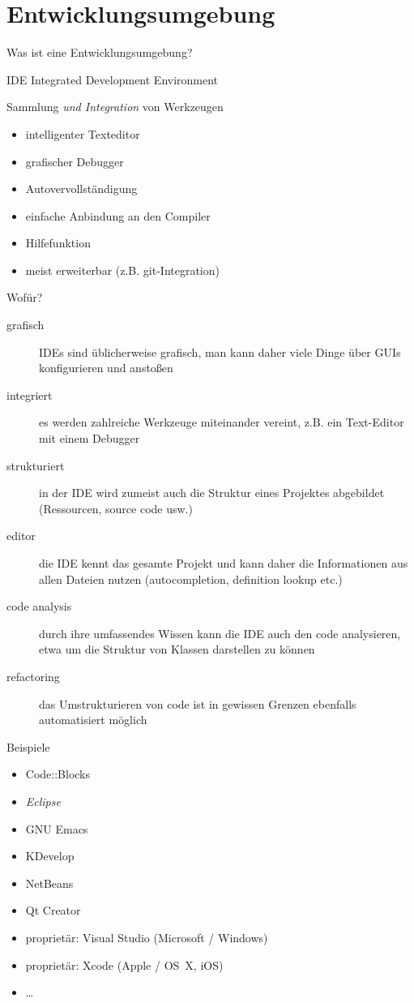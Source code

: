 \section{Entwicklungsumgebung}
\begin{frame}{Was ist eine Entwicklungsumgebung?}
	\begin{block}{IDE}
		Integrated Development Environment
	\end{block}
	\pause
	\begin{block}{Sammlung \emph{und Integration} von Werkzeugen}
		\begin{itemize}
			\item intelligenter Texteditor
			\item grafischer Debugger
			\item Autovervollständigung
			\item einfache Anbindung an den Compiler
			\item Hilfefunktion
			\item meist erweiterbar (z.B. git-Integration)
		\end{itemize}
	\end{block}
\end{frame}

\begin{frame}{Wofür?}
	\begin{description}
		\item[grafisch] IDEs sind üblicherweise grafisch, man kann daher viele Dinge über GUIs konfigurieren und anstoßen
		\item[integriert] es werden zahlreiche Werkzeuge miteinander vereint, z.B. ein Text-Editor mit einem Debugger
		\item[strukturiert] in der IDE wird zumeist auch die Struktur eines Projektes abgebildet (Ressourcen, source code usw.)
		\item[editor] die IDE kennt das gesamte Projekt und kann daher die Informationen aus allen Dateien nutzen (autocompletion, definition lookup etc.)
		\item[code analysis] durch ihre umfassendes Wissen kann die IDE auch den code analysieren, etwa um die Struktur von Klassen darstellen zu können
		\item[refactoring] das Umstrukturieren von code ist in gewissen Grenzen ebenfalls automatisiert möglich
	\end{description}
\end{frame}

\begin{frame}{Beispiele}
	\begin{itemize}
		\item Code::Blocks
		\item \emph{Eclipse}
		\item GNU Emacs
		\item KDevelop
		\item NetBeans
		\item Qt Creator
		\item proprietär: Visual Studio (Microsoft / Windows)
		\item proprietär: Xcode (Apple / OS~X, iOS)
		\item \dots
	\end{itemize}
\end{frame}